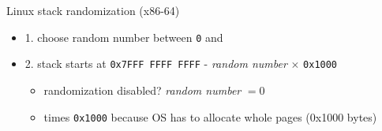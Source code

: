 \usetikzlibrary{calc,positioning,patterns,shapes.callouts}

\begin{frame}{Linux stack randomization (x86-64)}
\begin{itemize}
    \item 1. choose random number between \texttt{0} and 
    \item 2. stack starts at \texttt{0x7FFF FFFF FFFF} - \textit{random number} $\times$ \texttt{0x1000}
        \begin{itemize}
        \item randomization disabled? \textit{random number} $= 0$
        \item times \texttt{0x1000} because OS has to allocate whole pages (0x1000 bytes)
        \end{itemize}
\end{itemize}
\end{frame}



